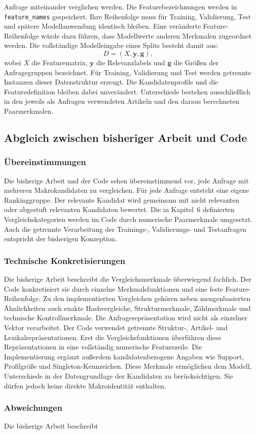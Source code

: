 Anfrage miteinander verglichen werden. Die Featurebezeichnungen werden in \texttt{feature\_names} gespeichert. Ihre Reihenfolge muss für Training, Validierung, Test und spätere Modellanwendung identisch bleiben. Eine veränderte Feature-Reihenfolge würde dazu führen, dass Modellwerte anderen Merkmalen zugeordnet werden. Die vollständige Modelleingabe eines Splits besteht damit aus: \begin{equation} D = \left( X, \boldsymbol{y}, \boldsymbol{g} \right), \label{eq:lambdamart_datensatz} \end{equation} wobei $X$ die Featurematrix, $\boldsymbol{y}$ die Relevanzlabels und $\boldsymbol{g}$ die Größen der Anfragegruppen bezeichnet. Für Training, Validierung und Test werden getrennte Instanzen dieser Datenstruktur erzeugt. Die Kandidatenprofile und die Featuredefinition bleiben dabei unverändert. Unterschiede bestehen ausschließlich in den jeweils als Anfragen verwendeten Artikeln und den daraus berechneten Paarmerkmalen. \subsection{Abgleich zwischen bisheriger Arbeit und Code} \label{subsec:abgleich_anfrage_kandidat_matrix} \subsubsection*{Übereinstimmungen} Die bisherige Arbeit und der Code sehen übereinstimmend vor, jede Anfrage mit mehreren Makrokandidaten zu vergleichen. Für jede Anfrage entsteht eine eigene Rankinggruppe. Der relevante Kandidat wird gemeinsam mit nicht relevanten oder abgestuft relevanten Kandidaten bewertet. Die in Kapitel~6 definierten Vergleichskategorien werden im Code durch numerische Paarmerkmale umgesetzt. Auch die getrennte Verarbeitung der Trainings-, Validierungs- und Testanfragen entspricht der bisherigen Konzeption. \subsubsection*{Technische Konkretisierungen} Die bisherige Arbeit beschreibt die Vergleichsmerkmale überwiegend fachlich. Der Code konkretisiert sie durch einzelne Merkmalsfunktionen und eine feste Feature-Reihenfolge. Zu den implementierten Vergleichen gehören neben mengenbasierten Ähnlichkeiten auch exakte Hashvergleiche, Strukturmerkmale, Zählmerkmale und technische Kontrollmerkmale. Die Anfragerepräsentation wird nicht als einzelner Vektor verarbeitet. Der Code verwendet getrennte Struktur-, Artikel- und Lexikalrepräsentationen. Erst die Vergleichsfunktionen überführen diese Repräsentationen in eine vollständig numerische Featurezeile. Die Implementierung ergänzt außerdem kandidatenbezogene Angaben wie Support, Profilgröße und Singleton-Kennzeichen. Diese Merkmale ermöglichen dem Modell, Unterschiede in der Datengrundlage der Kandidaten zu berücksichtigen. Sie dürfen jedoch keine direkte Makroidentität enthalten. \subsubsection*{Abweichungen} Die bisherige Arbeit beschreibt 